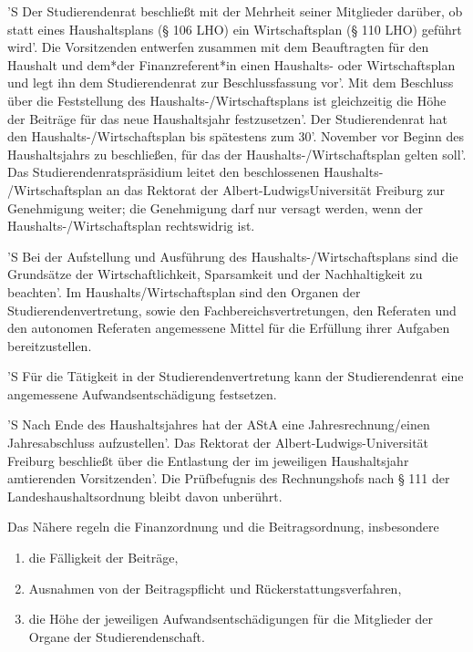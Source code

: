 \documentclass[fontsize=12pt,parskip=half]{scrartcl}
\begin{document}
\begin{contract}
  'S Der Studierendenrat beschließt mit der Mehrheit seiner Mitglieder darüber, ob
  statt eines Haushaltsplans (§ 106 LHO) ein Wirtschaftsplan (§ 110 LHO)
  geführt wird'. Die Vorsitzenden entwerfen zusammen mit dem Beauftragten für den
  Haushalt und dem*der Finanzreferent*in einen Haushalts- oder Wirtschaftsplan
  und legt ihn dem Studierendenrat zur Beschlussfassung vor'. Mit dem Beschluss
  über die Feststellung des Haushalts-/Wirtschaftsplans ist gleichzeitig   die
  Höhe der Beiträge für das neue Haushaltsjahr festzusetzen'. Der Studierendenrat
  hat den Haushalts-/Wirtschaftsplan bis spätestens zum 30'. November vor Beginn
  des Haushaltsjahrs zu beschließen, für das der Haushalts-/Wirtschaftsplan
  gelten soll'. Das Studierendenratspräsidium leitet den beschlossenen Haushalts-
  /Wirtschaftsplan an das Rektorat der Albert-LudwigsUniversität Freiburg zur
  Genehmigung weiter; die Genehmigung darf nur versagt werden, wenn der
  Haushalts-/Wirtschaftsplan rechtswidrig ist.

  'S Bei der Aufstellung und Ausführung des Haushalts-/Wirtschaftsplans sind die
  Grundsätze der Wirtschaftlichkeit, Sparsamkeit und der Nachhaltigkeit zu
  beachten'. Im Haushalts/Wirtschaftsplan sind den Organen der
  Studierendenvertretung, sowie den Fachbereichsvertretungen, den Referaten und
  den autonomen Referaten angemessene Mittel für die Erfüllung ihrer Aufgaben
  bereitzustellen.

  'S Für die Tätigkeit in der Studierendenvertretung kann der Studierendenrat eine
  angemessene Aufwandsentschädigung festsetzen.

  'S Nach Ende des Haushaltsjahres hat der AStA eine Jahresrechnung/einen
  Jahresabschluss aufzustellen'. Das Rektorat der Albert-Ludwigs-Universität
  Freiburg beschließt über die Entlastung der im jeweiligen Haushaltsjahr
  amtierenden Vorsitzenden'. Die Prüfbefugnis des Rechnungshofs nach § 111 der
  Landeshaushaltsordnung bleibt davon unberührt.

  Das Nähere regeln die Finanzordnung und die Beitragsordnung, insbesondere
  \begin{enumerate}[\qquad 1.]
  \item die Fälligkeit der Beiträge,
  \item Ausnahmen von der Beitragspflicht und Rückerstattungsverfahren,
  \item die Höhe der jeweiligen Aufwandsentschädigungen für die Mitglieder der
    Organe der Studierendenschaft.
  \end{enumerate}

\end{contract}
\end{document}
